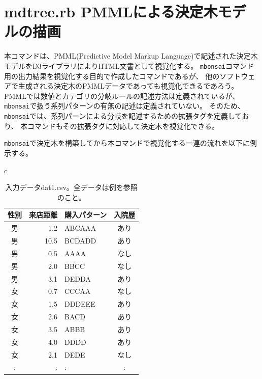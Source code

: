 



\section{mdtree.rb PMMLによる決定木モデルの描画\label{sect:mdtree}}
本コマンドは、PMML(Predictive Model Markup Language)で記述された決定木モデルをD3ライブラリによりHTML文書として視覚化する。
\verb|mbonsai|コマンド用の出力結果を視覚化する目的で作成したコマンドであるが、
他のソフトウェアで生成される決定木のPMMLデータであっても視覚化できるであろう。
PMMLでは数値とカテゴリの分岐ルールの記述方法は定義されているが、
\verb|mbonsai|で扱う系列パターンの有無の記述は定義されていない。
そのため、\verb|mbonsai|では、系列パーンによる分岐を記述するための拡張タグを定義しており、
本コマンドもその拡張タグに対応して決定木を視覚化できる。

\verb|mbonsai|で決定木を構築してから本コマンドで視覚化する一連の流れを以下に例示する。

\begin{table}[htbp]
\begin{center}
\begin{tabular}{c}

\begin{minipage}{0.5\hsize}
\begin{center}
\caption{入力データdat1.csv。全データは例を参照のこと。\label{tbl:mdtree_input1}}
{\small
\begin{tabular}{crlc}
\hline
性別&来店距離&購入パターン&入院歴 \\
\hline
男&1.2&ABCAAA&あり\\
男&10.5&BCDADD&あり\\
男&0.5&AAAA&なし\\
男&2.0&BBCC&なし\\
男&3.1&DEDDA&あり\\
女&0.7&CCCAA&なし\\
女&1.5&DDDEEE&あり\\
女&2.6&BACD&あり\\
女&3.5&ABBB&あり\\
女&4.0&DDDD&あり\\
女&2.1&DEDE&なし\\
:&:&:&:\\
\hline
\end{tabular} 
}
\end{center}
\end{minipage}

\end{tabular} 
\end{center}
\end{table} 

